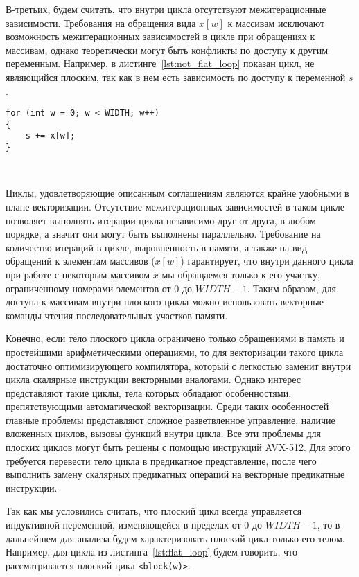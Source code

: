 \documentclass[
11pt,%
tightenlines,%
twoside,%
onecolumn,%
nofloats,%
nobibnotes,%
nofootinbib,%
superscriptaddress,%
noshowpacs,%
centertags]%
{revtex4}
\begin{document}
В-третьих, будем считать, что внутри цикла отсутствуют межитерационные зависимости.
Требования на обращения вида $x[w]$ к массивам исключают возможность межитерационных зависимостей в цикле при обращениях к массивам, однако теоретически могут быть конфликты по доступу к другим переменным.
Например, в листинге~\ref{lst:not_flat_loop} показан цикл, не являющийся плоским, так как в нем есть зависимость по доступу к переменной $s$.

\begin{lstlisting}[caption={Простейший пример неплоского цикла.},label={lst:not_flat_loop}]
for (int w = 0; w < WIDTH; w++)
{
    s += x[w];
}
\end{lstlisting}

\

Циклы, удовлетворяющие описанным соглашениям являются крайне удобными в плане векторизации.
Отсутствие межитерационных зависимостей в таком цикле позволяет выполнять итерации цикла независимо друг от друга, в любом порядке, а значит они могут быть выполнены параллельно.
Требование на количество итераций в цикле, выровненность в памяти, а также на вид обращений к элементам массивов ($x[w]$) гарантирует, что внутри данного цикла при работе с некоторым массивом $x$ мы обращаемся только к его участку, ограниченному номерами элементов от $0$ до $WIDTH - 1$.
Таким образом, для доступа к массивам внутри плоского цикла можно использовать векторные команды чтения последовательных участков памяти.

Конечно, если тело плоского цикла ограничено только обращениями в память и простейшими арифметическими операциями, то для векторизации такого цикла достаточно оптимизирующего компилятора, который с легкостью заменит внутри цикла скалярные инструкции векторными аналогами.
Однако интерес представляют такие циклы, тела которых обладают особенностями, препятствующими автоматической векторизации.
Среди таких особенностей главные проблемы представляют сложное разветвленное управление, наличие вложенных циклов, вызовы функций внутри цикла.
Все эти проблемы для плоских циклов могут быть решены с помощью инструкций AVX-512.
Для этого требуется перевести тело цикла в предикатное представление, после чего выполнить замену скалярных предикатных операций на векторные предикатные инструкции.

Так как мы условились считать, что плоский цикл всегда управляется индуктивной переменной, изменяющейся в пределах от $0$ до $WIDTH - 1$, то в дальнейшем для анализа будем характеризовать плоский цикл только его телом.
Например, для цикла из листинга~\ref{lst:flat_loop} будем говорить, что рассматривается плоский цикл \texttt{<block(w)>}.
\end{document}
